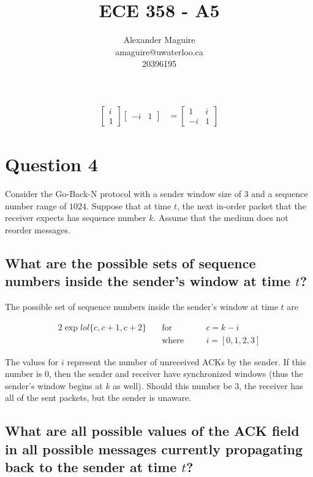 \documentclass[12pt]{article}
\begin{document}
\nocite{*}

\title{ECE 358 - A5}

\author{Alexander Maguire \\ 
amaguire@uwaterloo.ca \\
20396195}
\maketitle

\begin{align*}
\begin{bmatrix}i\\1\end{bmatrix}
\begin{bmatrix}-i&1\end{bmatrix}
&=
\begin{bmatrix}1&i\\-i&1\end{bmatrix}
\end{align*}


\section*{Question 4}
Consider the Go-Back-N protocol with a sender window size of $3$ and a sequence number range of $1024$. Suppose that at time $t$, the next in-order packet that the receiver expects has sequence number $k$. Assume that the medium does not reorder messages.

\subsection*{What are the possible sets of sequence numbers inside the sender's window at time $t$?}

The possible set of sequence numbers inside the sender's window at time $t$ are

\begin{alignat*}{2}
\exp{lol}
\{c, c + 1, c + 2\} \quad &\text{for} \quad && c = k - i \\
&\text{where} \quad && i= [0, 1, 2, 3]
\end{alignat*}

The values for $i$ represent the number of unreceived ACKs by the sender. If this number is 0, then the sender and receiver have synchronized windows (thus the sender's window begins at $k$ as well). Should this number be 3, the receiver has all of the sent packets, but the sender is unaware.

\subsection*{What are all possible values of the ACK field in all possible messages currently propagating back to the sender at time $t$?}
\end{document}
